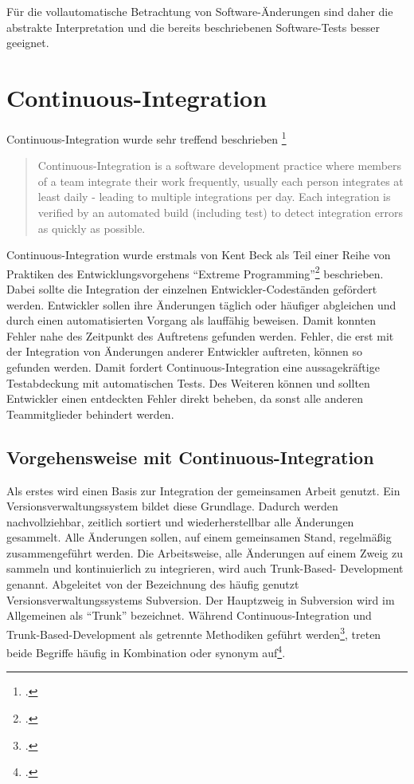 \vspace{1em}

Für die vollautomatische Betrachtung von Software-Änderungen sind daher die abstrakte Interpretation und die bereits beschriebenen Software-Tests besser geeignet. 

\section{Continuous-Integration}

Continuous-Integration wurde sehr treffend beschrieben \footcite[vgl.][]{fowler2006}

\blockquote {Continuous-Integration is a software development practice where members of a team integrate their work frequently, usually each person integrates at least daily - leading to multiple integrations per day. Each integration is verified by an automated build (including test) to detect integration errors as quickly as possible.}

Continuous-Integration wurde erstmals von Kent Beck als Teil einer Reihe von Praktiken des Entwicklungsvorgehens ``Extreme Programming''\footcite[vgl.][]{kent1999} beschrieben. Dabei sollte die Integration der einzelnen Entwickler-Codeständen gefördert werden. Entwickler sollen ihre Änderungen täglich oder häufiger abgleichen und durch einen automatisierten Vorgang als lauffähig beweisen. Damit konnten Fehler nahe des Zeitpunkt des Auftretens gefunden werden. Fehler, die erst mit der Integration von Änderungen anderer Entwickler auftreten, können so gefunden werden. Damit fordert Continuous-Integration eine aussagekräftige Testabdeckung mit automatischen Tests. Des Weiteren können und sollten Entwickler einen entdeckten Fehler direkt beheben, da sonst alle anderen Teammitglieder behindert werden.

\subsection{Vorgehensweise mit Continuous-Integration}

Als erstes wird einen Basis zur Integration der gemeinsamen Arbeit genutzt. Ein Versionsverwaltungssystem bildet diese Grundlage. Dadurch werden nachvollziehbar, zeitlich sortiert und wiederherstellbar alle Änderungen gesammelt. Alle Änderungen sollen, auf einem gemeinsamen Stand, regelmäßig zusammengeführt werden. Die Arbeitsweise, alle Änderungen auf einem Zweig zu sammeln und kontinuierlich zu integrieren, wird auch Trunk-Based-
Development genannt. Abgeleitet von der Bezeichnung des häufig genutzt Versionsverwaltungssystems Subversion. Der Hauptzweig in Subversion wird im Allgemeinen als ``Trunk'' bezeichnet. Während Continuous-Integration und Trunk-Based-Development als getrennte Methodiken geführt werden\footcite[vgl.][]{trunkbaseddevelopment}, treten beide Begriffe häufig in Kombination oder synonym auf\footcite[vgl.][]{fowler-feature-branch}.


